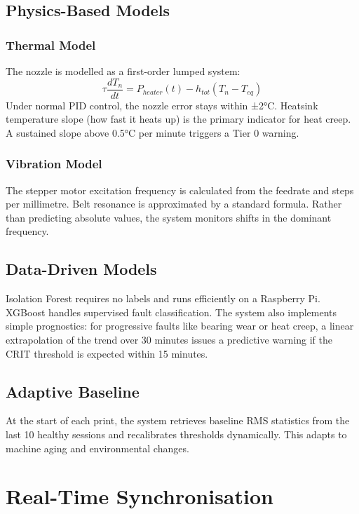 \subsection{Physics-Based Models}

\subsubsection{Thermal Model}
The nozzle is modelled as a first-order lumped system:
\[
\tau \frac{dT_n}{dt} = P_{heater}(t) - h_{tot}(T_n - T_{eq})
\]
Under normal PID control, the nozzle error stays within ±2°C. Heatsink temperature slope (how fast it heats up) is the primary indicator for heat creep. A sustained slope above 0.5°C per minute triggers a Tier 0 warning.

\subsubsection{Vibration Model}
The stepper motor excitation frequency is calculated from the feedrate and steps per millimetre. Belt resonance is approximated by a standard formula. Rather than predicting absolute values, the system monitors shifts in the dominant frequency.

\subsection{Data-Driven Models}

Isolation Forest requires no labels and runs efficiently on a Raspberry Pi. XGBoost handles supervised fault classification. The system also implements simple prognostics: for progressive faults like bearing wear or heat creep, a linear extrapolation of the trend over 30 minutes issues a predictive warning if the CRIT threshold is expected within 15 minutes.

\subsection{Adaptive Baseline}

At the start of each print, the system retrieves baseline RMS statistics from the last 10 healthy sessions and recalibrates thresholds dynamically. This adapts to machine aging and environmental changes.

\section{Real-Time Synchronisation}

